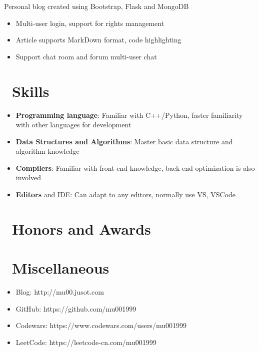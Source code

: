 \documentclass{resume}
\begin{document}
Personal blog created using Bootstrap, Flask and MongoDB
\begin{onehalfspacing}
\begin{itemize}
  \item Multi-user login, support for rights management
  \item Article supports MarkDown format, code highlighting
  \item Support chat room and forum multi-user chat
\end{itemize}
\end{onehalfspacing}


\section{\faCogs\ Skills}
\begin{itemize}[parsep=0.5ex]
  \item \textbf{Programming language}: Familiar with C++/Python, faster familiarity with other languages for development
  \item \textbf{Data Structures and Algorithms}: Master basic data structure and algorithm knowledge
  \item \textbf{Compilers}: Familiar with front-end knowledge, back-end optimization is also involved
  \item \textbf{Editors} and IDE: Can adapt to any editors, normally use VS, VSCode
\end{itemize}

\section{\faHeartO\ Honors and Awards}

\section{\faInfo\ Miscellaneous}
\begin{itemize}[parsep=0.5ex]
  \item Blog: http://mu00.jusot.com
  \item GitHub: https://github.com/mu001999
  \item Codewars: https://www.codewars.com/users/mu001999
\item LeetCode: https://leetcode-cn.com/mu001999
\end{itemize}

%
%
\end{document}
